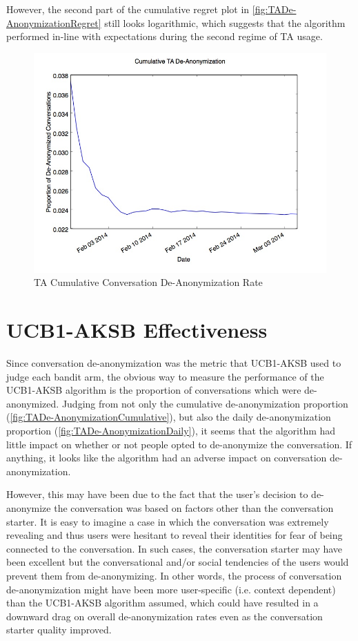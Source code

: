 However, the second part of the cumulative regret plot in \autoref{fig:TADe-AnonymizationRegret} still looks logarithmic, which suggests that the algorithm performed in-line with expectations during the second regime of TA usage.

\begin{figure}[H]
\centering
\includegraphics[trim= 0mm 0mm 0mm 0mm, clip, scale=0.5]{./Figures/CumulativeTADe-Anonymization.jpg}
\caption{TA Cumulative Conversation De-Anonymization Rate}
\label{fig:TADe-AnonymizationCumulative}
\end{figure}

\section{UCB1-AKSB Effectiveness}

Since conversation de-anonymization was the metric that UCB1-AKSB used to judge each bandit arm, the obvious way to measure the performance of the UCB1-AKSB algorithm is the proportion of conversations which were de-anonymized. Judging from not only the cumulative de-anonymization proportion (\autoref{fig:TADe-AnonymizationCumulative}), but also the daily de-anonymization proportion (\autoref{fig:TADe-AnonymizationDaily}), it seems that the algorithm had little impact on whether or not people opted to de-anonymize the conversation. If anything, it looks like the algorithm had an adverse impact on conversation de-anonymization.

However, this may have been due to the fact that the user's decision to de-anonymize the conversation was based on factors other than the conversation starter. It is easy to imagine a case in which the conversation was extremely revealing and thus users were hesitant to reveal their identities for fear of being connected to the conversation. In such cases, the conversation starter may have been excellent but the conversational and/or social tendencies of the users would prevent them from de-anonymizing. In other words, the process of conversation de-anonymization might have been more user-specific (i.e. context dependent) than the UCB1-AKSB algorithm assumed, which could have resulted in a downward drag on overall de-anonymization rates even as the conversation starter quality improved.

